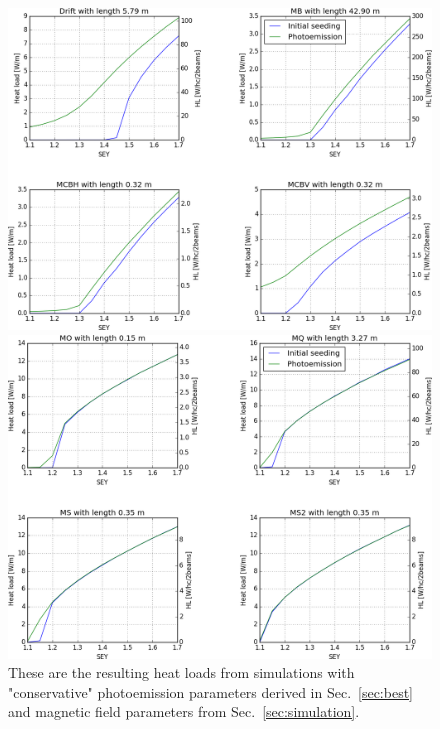 \begin{figure}[tbh]
    \centering
    \begin{minipage}[c]{0.8\textwidth}
        \includegraphics[width=\textwidth]{../plots/study_2.png}
    \end{minipage}

    \vspace{0.5cm}

    \begin{minipage}[c]{0.8\textwidth}
        \includegraphics[width=\textwidth]{../plots/study_3.png}
    \end{minipage}
    \caption{These are the resulting heat loads from simulations with "conservative" photoemission parameters derived in Sec.~\ref{sec:best} and magnetic field parameters from Sec.~\ref{sec:simulation}.}
    \label{fig:simulation}
\end{figure}


